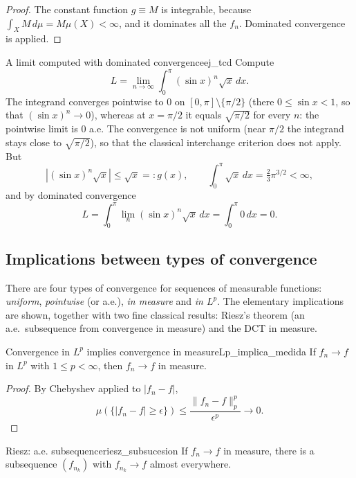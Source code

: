 \documentclass[11pt, a4paper]{article}
\begin{document}
\begin{proof}
The constant function $g \equiv M$ is integrable, because $\int_X M \, d\mu = M \mu(X) < \infty$,
and it dominates all the $f_n$. Dominated convergence is applied.
\end{proof}

\begin{ejemplo}{A limit computed with dominated convergence}{ej_tcd}
Compute
$$ L = \lim_{n \to \infty} \int_0^\pi (\sin x)^n \sqrt{x} \, dx. $$
The integrand converges pointwise to $0$ on $[0, \pi] \setminus \{\pi/2\}$ (there
$0 \le \sin x < 1$, so that $(\sin x)^n \to 0$), whereas at
$x = \pi/2$ it equals $\sqrt{\pi/2}$ for every $n$: the pointwise limit is $0$ a.e. The convergence
is not uniform (near $\pi/2$ the integrand stays close to $\sqrt{\pi/2}$), so
that the classical interchange criterion does not apply. But
$$ |(\sin x)^n \sqrt{x}| \le \sqrt{x} =: g(x), \qquad \int_0^\pi \sqrt{x} \, dx =
\tfrac{2}{3} \pi^{3/2} < \infty, $$
and by dominated convergence
$$ L = \int_0^\pi \lim_n (\sin x)^n \sqrt{x} \, dx = \int_0^\pi 0 \, dx = 0. $$
\end{ejemplo}

\subsection{Implications between types of convergence}

There are four types of convergence for sequences of measurable functions: \emph{uniform},
\emph{pointwise} (or a.e.), \emph{in measure} and \emph{in $L^p$}. The elementary
implications are shown, together with two fine classical results: Riesz's theorem (an a.e.\ subsequence from
convergence in measure) and the DCT in measure.

\begin{proposicion}{Convergence in $L^p$ implies convergence in measure}{Lp_implica_medida}
If $f_n \to f$ in $L^p$ with $1 \le p < \infty$, then $f_n \to f$ in measure.
\end{proposicion}

\begin{proof}
By Chebyshev applied to $|f_n - f|$,
$$ \mu(\{|f_n - f| \ge \epsilon\}) \le \frac{\|f_n - f\|_p^p}{\epsilon^p} \to 0. $$
\end{proof}

\begin{teorema}{Riesz: a.e. subsequence}{riesz_subsucesion}
If $f_n \to f$ in measure, there is a subsequence $(f_{n_k})$ with $f_{n_k} \to f$ almost everywhere.
\end{teorema}
\end{document}
